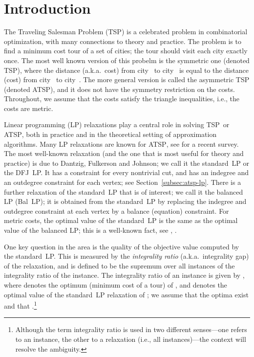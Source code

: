 \documentclass[11pt]{article}
\newcommand{\tsp}{\textsc{TSP}}
\newcommand{\atsp}{\textsc{ATSP}}
\begin{document}
\section{Introduction}\label{sec:intro}


The Traveling Salesman Problem (\tsp) is a celebrated problem in
combinatorial optimization, with many connections to theory and
practice.  The problem is to find a minimum cost tour of a set of
cities; the tour should visit each city exactly once. The most well
known version of this probelm is the symmetric one (denoted \tsp),
where the distance (a.k.a.~cost) from city~ to city~ is equal to
the distance (cost) from city~ to city~. The more general version
is called the asymmetric TSP (denoted \atsp), and it does not have the symmetry
restriction on the costs. Throughout, we assume that the costs satisfy
the triangle inequalities, i.e., the costs are metric.

Linear programming (LP) relaxations play a central role in solving  \tsp\ 
or \atsp, both in
practice and in the theoretical setting of approximation algorithms.
Many LP relaxations are known for \atsp, see \cite{RT12} for a recent
survey. The most well-known relaxation (and the one that is most useful
for theory and practice) is due to Dantzig, Fulkerson and Johnson; we
call it the standard~LP or the DFJ~LP. It has a constraint for every
nontrivial cut, and has an indegree and an outdegree constraint for
each vertex; see Section~\ref{subsec:atsp-lp}.
There is a further relaxation of the standard~LP that is of interest; we
call it the balanced LP (Bal~LP); it is obtained from the standard~LP
by replacing the indegree and outdegree constraint at each vertex by a
balance (equation) constraint. For metric costs, the optimal value of
the standard~LP is the same as the optimal value of the balanced LP;
this is a well-known fact, see \cite{RT12}, \cite[Footnote~3]{CGK06}.

One key question in the area is the quality of the objective value
computed by the standard~LP.  This is measured by the \textit{integrality
ratio} (a.k.a.~integrality gap) of the relaxation, and is defined to be
the supremum over all instances of the integrality ratio of the
instance.  The integrality ratio of an instance  is given by
, where  denotes the optimum (minimum cost of
a tour) of , and  denotes the optimal value of the standard~LP
relaxation of ; we assume that the optima exist and that
.\footnote{
Although the term integrality ratio is used in two different
senses---one refers to an instance, the other to a relaxation
(i.e., all instances)---the context will resolve the ambiguity.}
\end{document}
